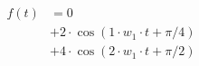 \begin{center}
\begin{align*}
f(t)
&= 0 \\
&+ 2 \cdot \cos( 1 \cdot w_1 \cdot t + \pi/4) \\
&+ 4 \cdot \cos( 2 \cdot w_1 \cdot t + \pi/2)
\end{align*}
\end{center}
